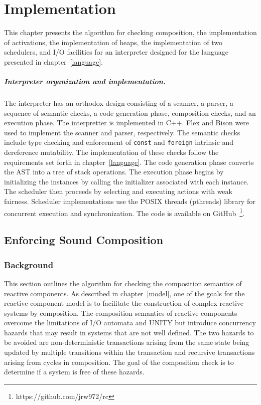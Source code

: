 \chapter{Implementation \label{implementation}}

This chapter presents the algorithm for checking composition, the implementation of activations, the implementation of heaps, the implementation of two schedulers, and I/O facilities for an interpreter designed for the language presented in chapter~\ref{language}.

\paragraph{Interpreter organization and implementation.}
The interpreter has an orthodox design consisting of a scanner, a parser, a sequence of semantic checks, a code generation phase, composition checks, and an execution phase.
The interpretter is implemented in C++.
Flex and Bison were used to implement the scanner and parser, respectively.
The semantic checks include type checking and enforcement of \verb+const+ and \verb+foreign+ intrinsic and dereference mutability.
The implementation of these checks follow the requirements set forth in chapter~\ref{language}.
The code generation phase converts the AST into a tree of stack operations.
The execution phase begins by initializing the instances by calling the initializer associated with each instance.
The scheduler then proceeds by selecting and executing actions with weak fairness.
Scheduler implementations use the POSIX threads (pthreads) library for concurrent execution and synchronization.
The code is available on GitHub~\footnote{https://github.com/jrw972/rc}.

\section{Enforcing Sound Composition}

\subsection{Background}

This section outlines the algorithm for checking the composition semantics of reactive components.
As described in chapter~\ref{model}, one of the goals for the reactive component model is to facilitate the construction of complex reactive systems by composition.
The composition semantics of reactive components overcome the limitations of I/O automata and UNITY but introduce concurrency hazards that may result in systems that are not well defined.
The two hazards to be avoided are non-deterministic transactions arising from the same state being updated by multiple transitions within the transaction and recursive transactions arising from cycles in composition.
The goal of the composition check is to determine if a system is free of these hazards.

